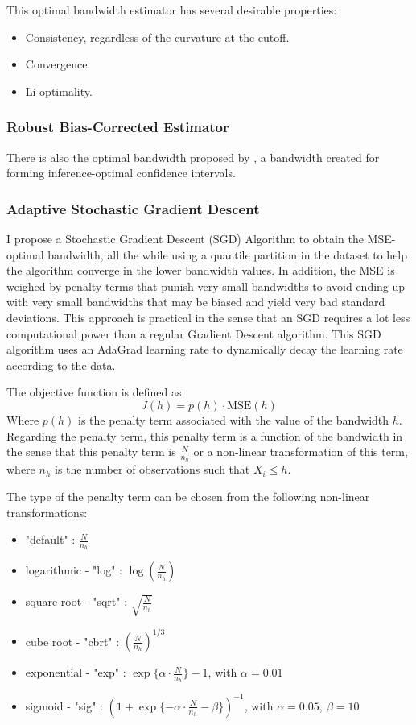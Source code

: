 \documentclass[12pt]{article}
\theoremstyle{plain}
\theoremstyle{remark}
\begin{document}
This optimal bandwidth estimator has several desirable properties:

\begin{itemize}
    \item Consistency, regardless of the curvature at the cutoff.
    \item Convergence.
    \item Li-optimality.
\end{itemize}

\subsubsection{Robust Bias-Corrected Estimator \parencite{Calonico2014Robust}}
There is also the optimal bandwidth proposed by \textcite{Calonico2014Robust}, a bandwidth created for forming inference-optimal confidence intervals. %

\subsubsection{Adaptive Stochastic Gradient Descent}
I propose a Stochastic Gradient Descent (SGD) Algorithm to obtain the MSE-optimal bandwidth, all the while using a quantile partition in the dataset to help the algorithm converge in the lower bandwidth values. In addition, the MSE is weighed by penalty terms that punish very small bandwidths to avoid ending up with very small bandwidths that may be biased and yield very bad standard deviations. This approach is practical in the sense that an SGD requires a lot less computational power than a regular Gradient Descent algorithm. This SGD algorithm uses an AdaGrad learning rate to dynamically decay the learning rate according to the data. 

The objective function is defined as \[J(h) = p(h)\cdot \text{MSE}(h)\] Where $p(h)$ is the penalty term associated with the value of the bandwidth $h$. Regarding the penalty term, this penalty term is a function of the bandwidth in the sense that this penalty term is $\frac{N}{n_h}$ or a non-linear transformation of this term, where $n_h$ is the number of observations such that $X_{i}\leq h$.

The type of the penalty term can be chosen from the following non-linear transformations:
\begin{itemize}
    \item "default" : $\frac{N}{n_h}$
    \item logarithmic - "log" : $\log(\frac{N}{n_h})$
    \item square root - "sqrt" : $\sqrt{\frac{N}{n_h}}$
    \item cube root - "cbrt" : $(\frac{N}{n_h})^{1/3}$
    \item exponential - "exp" : $\exp\{\alpha\cdot\frac{N}{n_h}\} -1 $, with $\alpha=0.01$
    \item sigmoid - "sig" : $({1+\exp\{-\alpha\cdot\frac{N}{n_h}-\beta\}})^{-1}$, with $\alpha=0.05,\ \beta=10$
\end{itemize}
\end{document}
